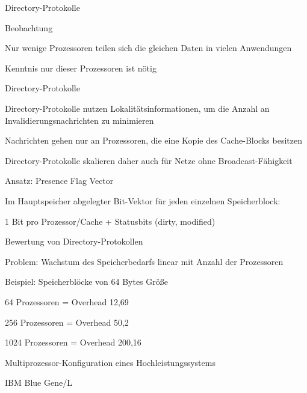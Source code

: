 \documentclass[10pt,landscape]{article}
\begin{document}
\begin{multicols}{3}
  Directory-Protokolle
  \begin{itemize*}
    \item Beobachtung
    \item Nur wenige Prozessoren teilen sich die gleichen Daten in vielen Anwendungen
    \item Kenntnis nur dieser Prozessoren ist nötig
    \item Directory-Protokolle
    \item Directory-Protokolle nutzen Lokalitätsinformationen, um die Anzahl an Invalidierungsnachrichten zu minimieren
    \item Nachrichten gehen nur an Prozessoren, die eine Kopie des Cache-Blocks besitzen
    \item Directory-Protokolle skalieren daher auch für Netze ohne Broadcast-Fähigkeit
    \item Ansatz: Presence Flag Vector
    \item Im Hauptspeicher abgelegter Bit-Vektor für jeden einzelnen Speicherblock:
    \item 1 Bit pro Prozessor/Cache + Statusbits (dirty, modified)
    \item Bewertung von Directory-Protokollen
    \item Problem: Wachstum des Speicherbedarfs linear mit Anzahl der Prozessoren
    \item Beispiel: Speicherblöcke von 64 Bytes Größe
    \item 64 Prozessoren = Overhead 12,69%
    \item 256 Prozessoren = Overhead 50,2%
    \item 1024 Prozessoren = Overhead 200,16%
  \end{itemize*}
  
  Multiprozessor-Konfiguration eines Hochleistungssystems
  
  IBM Blue Gene/L
  
  
  
\end{multicols}
\end{document}
